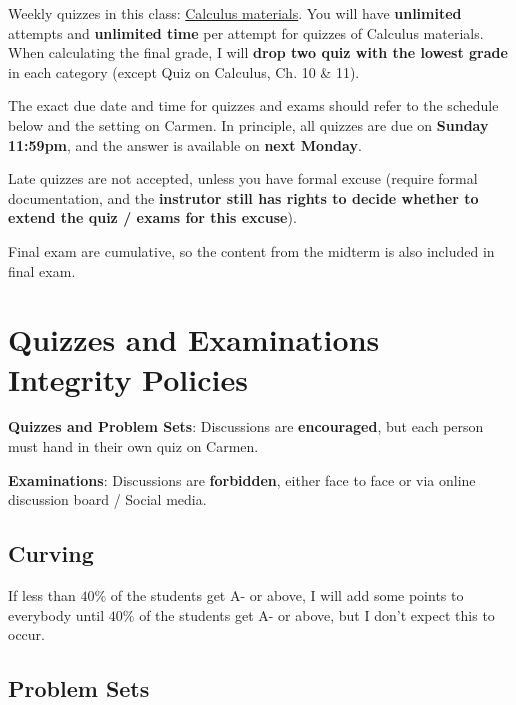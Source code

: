 \documentclass[12pt]{article}
\begin{document}
Weekly quizzes in this class: \underline{Calculus materials}.
You will have \textbf{unlimited} attempts and \textbf{unlimited time} per attempt for quizzes of Calculus materials.
When calculating the final grade, I will \textbf{drop two quiz with the lowest grade} in each category (except Quiz on Calculus, Ch. 10 \& 11).

The exact due date and time for quizzes and exams should refer to the schedule below and the setting on Carmen.
In principle, all quizzes are due on \textbf{Sunday 11:59pm}, and the answer is available on \textbf{next Monday}.

Late quizzes are not accepted, unless you have formal excuse (require formal documentation, and the \textbf{instrutor still has rights to decide whether to extend the quiz / exams for this excuse}).

Final exam are cumulative, so the content from the midterm is also included in final exam.

\section*{Quizzes and Examinations Integrity Policies}

\textbf{Quizzes and Problem Sets}: Discussions are \textbf{encouraged}, but each person must hand in their own quiz on Carmen.

\textbf{Examinations}: Discussions are \textbf{forbidden}, either face to face or via online discussion board / Social media.



\subsection*{Curving}

If less than $40\%$ of the students get A- or above, I will add some points to everybody until $40\%$ of the students get A- or above, but I don’t expect this to occur.

\subsection*{Problem Sets}
\label{sub:Problem_Sets}
\end{document}

